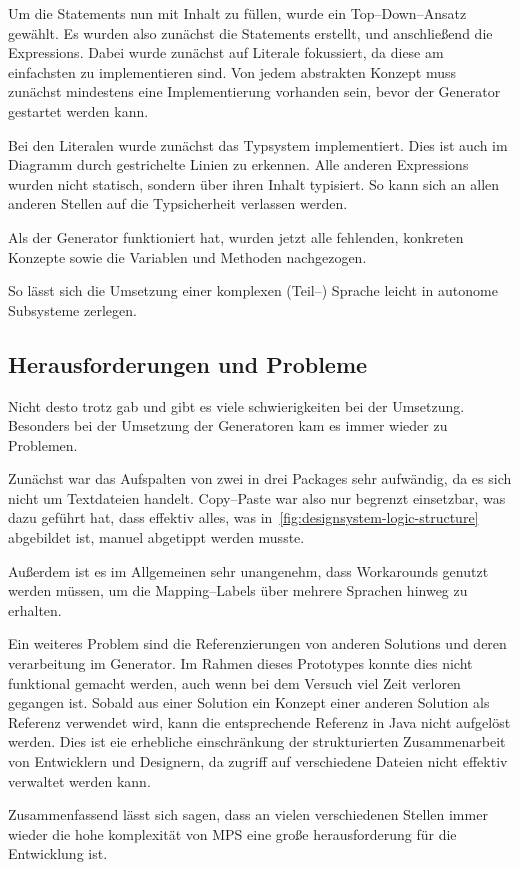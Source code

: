 Um die Statements nun mit Inhalt zu füllen, wurde ein Top--Down--Ansatz gewählt.
Es wurden also zunächst die Statements erstellt, und anschließend die Expressions.
Dabei wurde zunächst auf Literale fokussiert, da diese am einfachsten zu implementieren sind.
Von jedem abstrakten Konzept muss zunächst mindestens eine Implementierung vorhanden sein, bevor der Generator gestartet werden kann.

Bei den Literalen wurde zunächst das Typsystem implementiert.
Dies ist auch im Diagramm durch gestrichelte Linien zu erkennen.
Alle anderen Expressions wurden nicht statisch, sondern über ihren Inhalt typisiert.
So kann sich an allen anderen Stellen auf die Typsicherheit verlassen werden.

Als der Generator funktioniert hat, wurden jetzt alle fehlenden, konkreten Konzepte sowie die Variablen und Methoden nachgezogen.

So lässt sich die Umsetzung einer komplexen (Teil--) Sprache leicht in autonome Subsysteme zerlegen.

\subsection{Herausforderungen und Probleme}\label{subsec:herausforderungen-und-probleme}
Nicht desto trotz gab und gibt es viele schwierigkeiten bei der Umsetzung.
Besonders bei der Umsetzung der Generatoren kam es immer wieder zu Problemen.

Zunächst war das Aufspalten von zwei in drei Packages sehr aufwändig, da es sich nicht um Textdateien handelt.
Copy--Paste war also nur begrenzt einsetzbar, was dazu geführt hat, dass effektiv alles, was in~\autoref{fig:designsystem-logic-structure} abgebildet ist, manuel abgetippt werden musste.

Außerdem ist es im Allgemeinen sehr unangenehm, dass Workarounds genutzt werden müssen, um die Mapping--Labels über mehrere Sprachen hinweg zu erhalten.

Ein weiteres Problem sind die Referenzierungen von anderen Solutions und deren verarbeitung im Generator.
Im Rahmen dieses Prototypes konnte dies nicht funktional gemacht werden, auch wenn bei dem Versuch viel Zeit verloren gegangen ist.
Sobald aus einer Solution ein Konzept einer anderen Solution als Referenz verwendet wird, kann die entsprechende Referenz in Java nicht aufgelöst werden.
Dies ist eie erhebliche einschränkung der strukturierten Zusammenarbeit von Entwicklern und Designern, da zugriff auf verschiedene Dateien nicht effektiv verwaltet werden kann.

Zusammenfassend lässt sich sagen, dass an vielen verschiedenen Stellen immer wieder die hohe komplexität von \ac{MPS} eine große herausforderung für die Entwicklung ist.
